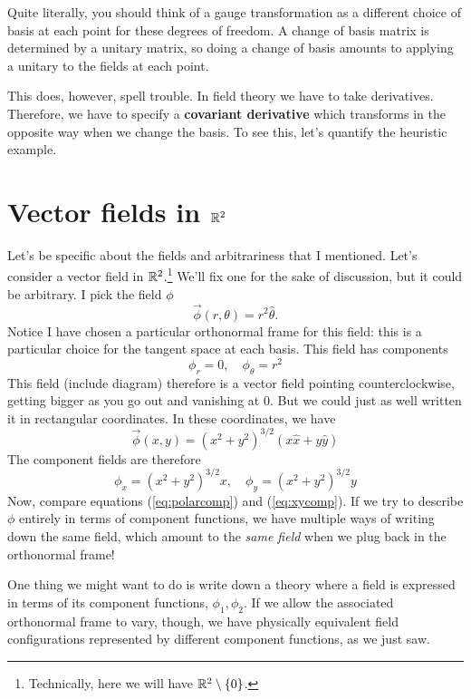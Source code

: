 \documentclass[main.tex]{subfiles}
\begin{document}
Quite literally, you should think of a gauge transformation as a different choice of basis at each point for these degrees of freedom. A change of basis matrix is determined by a unitary matrix, so doing a change of basis amounts to applying a unitary to the fields at each point. 

This does, however, spell trouble. In field theory we have to take derivatives. Therefore, we have to specify a \textbf{covariant derivative} which transforms in the opposite way when we change the basis. To see this, let's quantify the heuristic example.

\section{Vector fields in $\mathbb{R}^2$}
Let's be specific about the fields and arbitrariness that I mentioned. Let's consider a vector field in $\mathbb{R}^2$.\footnote{Technically, here we will have $\mathbb{R}^2\setminus\{0\}$.} We'll fix one for the sake of discussion, but it could be arbitrary. I pick the field $\phi$
\begin{equation} \label{eq:polar}
\vec{\phi}(r,\theta) = r^2 \hat{\theta}.
\end{equation}
Notice I have chosen a particular orthonormal frame for this field: this is a particular choice for the tangent space at each basis. This field has components 
\begin{equation} \label{eq:polarcomp}
\phi_r = 0, \quad \phi_\theta = r^2
\end{equation}
This field (include diagram) therefore is a vector field pointing counterclockwise, getting bigger as you go out and vanishing at $0$. But we could just as well written it in rectangular coordinates. In these coordinates, we have
\begin{equation} \label{eq:xy}
\vec{\phi}(x,y) = (x^2 + y^2)^{3/2} \left(x \hat{x} + y \hat{y} 
\right)
\end{equation}
The component fields are therefore
\begin{equation} \label{eq:xycomp}
\phi_x = (x^2 + y^2)^{3/2} x, \quad \phi_y = (x^2 + y^2)^{3/2} y
\end{equation}
Now, compare equations (\ref{eq:polarcomp}) and (\ref{eq:xycomp}). If we try to describe $\phi$ entirely in terms of component functions, we have multiple ways of writing down the same field, which amount to the \textit{same field} when we plug back in the orthonormal frame! 

One thing we might want to do is write down a theory where a field is expressed in terms of its component functions, $\phi_1,\phi_2$. If we allow the associated orthonormal frame to vary, though, we have physically equivalent field configurations represented by different component functions, as we just saw. 
\end{document}

